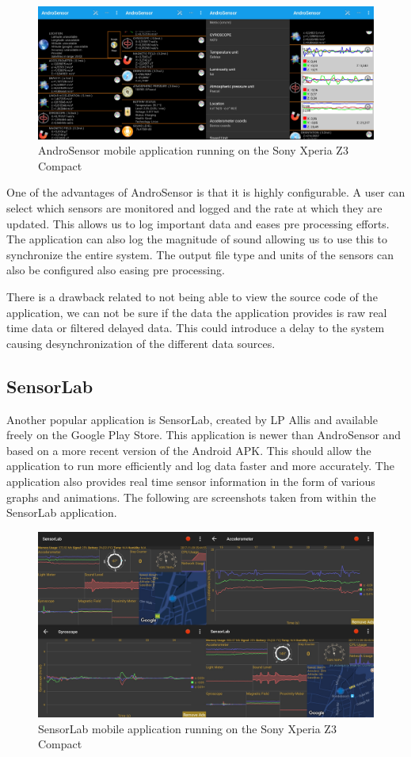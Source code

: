 \begin{figure}[!ht] 
\captionsetup{width=0.8\linewidth, font=small}  
\includegraphics[width=0.8\linewidth]{figures/screeniesas.jpg}
\caption{AndroSensor mobile application running on the Sony Xperia Z3 Compact}
\label{fig:screeniesas}
\end{figure}

One of the advantages of AndroSensor is that it is highly configurable. A user can select which sensors are monitored and logged and the rate at which they are updated. This allows us to log important data and eases pre processing efforts. The application can also log the magnitude of sound allowing us to use this to synchronize the entire system. The output file type and units of the sensors can also be configured also easing pre processing. 

There is a drawback related to not being able to view the source code of the application, we can not be sure if the data the application provides is raw real time data or filtered delayed data. This could introduce a delay to the system causing desynchronization of the different data sources.

\subsection{SensorLab}
Another popular application is SensorLab, created by LP Allis and available freely on the Google Play Store. This application is newer than AndroSensor and based on a more recent version of the Android APK. This should allow the application to run more efficiently and log data faster and more accurately. The application also provides real time sensor information in the form of various graphs and animations. The following are screenshots taken from within the SensorLab application.

\begin{figure}[!ht] 
\captionsetup{width=0.8\linewidth, font=small}  
\includegraphics[width=0.8\linewidth]{figures/sls.jpg}
\caption{SensorLab mobile application running on the Sony Xperia Z3 Compact}
\label{fig:screeniessl}
\end{figure}

